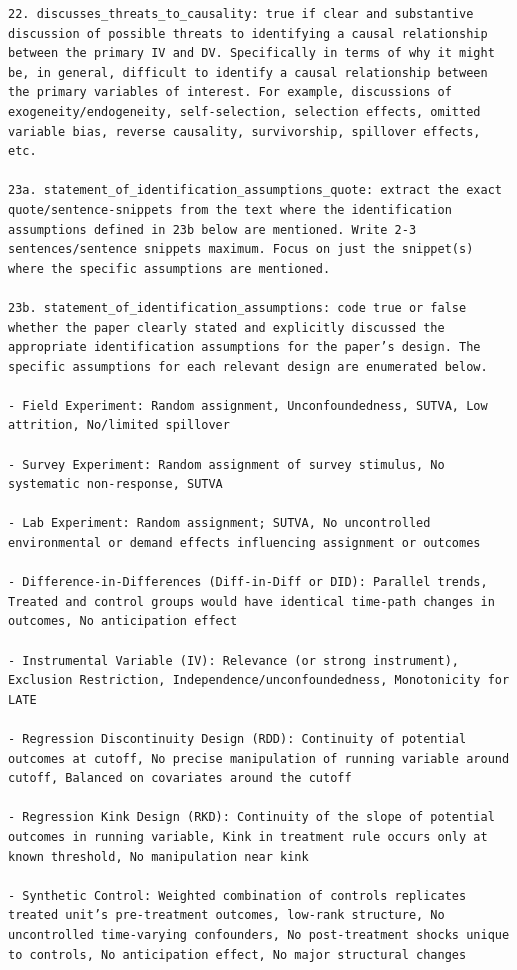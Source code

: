\documentclass[12pt]{article}
\begin{document}
{\begin{Verbatim}[breaklines=true]
22. discusses_threats_to_causality: true if clear and substantive discussion of possible threats to identifying a causal relationship between the primary IV and DV. Specifically in terms of why it might be, in general, difficult to identify a causal relationship between the primary variables of interest. For example, discussions of exogeneity/endogeneity, self-selection, selection effects, omitted variable bias, reverse causality, survivorship, spillover effects, etc.

23a. statement_of_identification_assumptions_quote: extract the exact quote/sentence-snippets from the text where the identification assumptions defined in 23b below are mentioned. Write 2-3 sentences/sentence snippets maximum. Focus on just the snippet(s) where the specific assumptions are mentioned.

23b. statement_of_identification_assumptions: code true or false whether the paper clearly stated and explicitly discussed the appropriate identification assumptions for the paper’s design. The specific assumptions for each relevant design are enumerated below.

- Field Experiment: Random assignment, Unconfoundedness, SUTVA, Low attrition, No/limited spillover

- Survey Experiment: Random assignment of survey stimulus, No systematic non-response, SUTVA

- Lab Experiment: Random assignment; SUTVA, No uncontrolled environmental or demand effects influencing assignment or outcomes

- Difference-in-Differences (Diff-in-Diff or DID): Parallel trends, Treated and control groups would have identical time-path changes in outcomes, No anticipation effect

- Instrumental Variable (IV): Relevance (or strong instrument), Exclusion Restriction, Independence/unconfoundedness, Monotonicity for LATE

- Regression Discontinuity Design (RDD): Continuity of potential outcomes at cutoff, No precise manipulation of running variable around cutoff, Balanced on covariates around the cutoff

- Regression Kink Design (RKD): Continuity of the slope of potential outcomes in running variable, Kink in treatment rule occurs only at known threshold, No manipulation near kink

- Synthetic Control: Weighted combination of controls replicates treated unit’s pre-treatment outcomes, low-rank structure, No uncontrolled time-varying confounders, No post-treatment shocks unique to controls, No anticipation effect, No major structural changes 


\end{Verbatim}}
\end{document}

